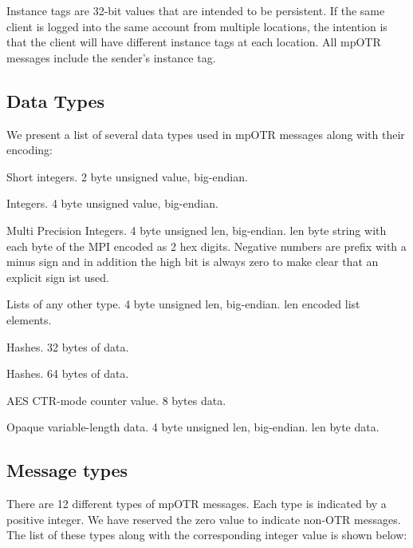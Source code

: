 Instance tags are 32-bit values that are intended to be persistent. If the same client is logged into the same account from multiple locations, the intention is that the client will have different instance tags at each location. All mpOTR messages include the sender's instance tag.

\subsection{Data Types}
We present a list of several data types used in mpOTR messages along with their encoding:
\begin{description}[align=left]
\item [SHORT] Short integers. 2 byte unsigned value, big-endian.
\item [INT] Integers. 4 byte unsigned value, big-endian.
\item [MPI] Multi Precision Integers. 4 byte unsigned len, big-endian. len byte string with each byte of the MPI encoded as 2 hex digits. Negative numbers are prefix with a minus sign and in addition the high bit is always zero to make clear that an explicit sign ist used.
\item [LIST] Lists of any other type. 4 byte unsigned len, big-endian. len encoded list elements.
\item[HASH32] Hashes. 32 bytes of data.
\item[HASH64] Hashes. 64 bytes of data.
\item[CTR] AES CTR-mode counter value. 8 bytes data.
\item[DATA] Opaque variable-length data. 4 byte unsigned len, big-endian. len byte data.
\end{description}

\subsection{Message types}
\label{subsections:message_types}
There are 12 different types of mpOTR messages. Each type is indicated by a positive integer. We have reserved the zero value to indicate non-OTR messages. The list of these types along with the corresponding integer value is shown below:

